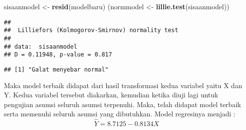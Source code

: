 \documentclass[
]{article}
\newenvironment{Shaded}{\begin{snugshade}}{\end{snugshade}}
\newcommand{\FloatTok}[1]{\textcolor[rgb]{0.00,0.00,0.81}{#1}}
\newcommand{\FunctionTok}[1]{\textcolor[rgb]{0.13,0.29,0.53}{\textbf{#1}}}
\newcommand{\NormalTok}[1]{#1}
\newcommand{\OtherTok}[1]{\textcolor[rgb]{0.56,0.35,0.01}{#1}}
\newcommand{\SpecialCharTok}[1]{\textcolor[rgb]{0.81,0.36,0.00}{\textbf{#1}}}
\newcommand{\StringTok}[1]{\textcolor[rgb]{0.31,0.60,0.02}{#1}}
\begin{document}
\begin{Shaded}
\begin{Highlighting}[]
\NormalTok{sisaanmodel }\OtherTok{\textless{}{-}} \FunctionTok{resid}\NormalTok{(modelbaru)}
\NormalTok{(normmodel }\OtherTok{\textless{}{-}} \FunctionTok{lillie.test}\NormalTok{(sisaanmodel))}
\end{Highlighting}
\end{Shaded}

\begin{verbatim}
## 
##  Lilliefors (Kolmogorov-Smirnov) normality test
## 
## data:  sisaanmodel
## D = 0.11948, p-value = 0.817
\end{verbatim}

\begin{Shaded}
\end{Shaded}

\begin{verbatim}
## [1] "Galat menyebar normal"
\end{verbatim}

Maka model terbaik didapat dari hasil transformasi kedua variabel yaitu
X dan Y. Kedua variabel tersebut diakarkan, kemudian ketika diuji lagi
untuk pengujian asumsi seluruh asumsi terpenuhi. Maka, telah didapat
model terbaik serta memenuhi seluruh asumsi yang dibutuhkan. Model
regresinya menjadi : \[ \hat Y = 8.7125-0.8134X \]
\end{document}
